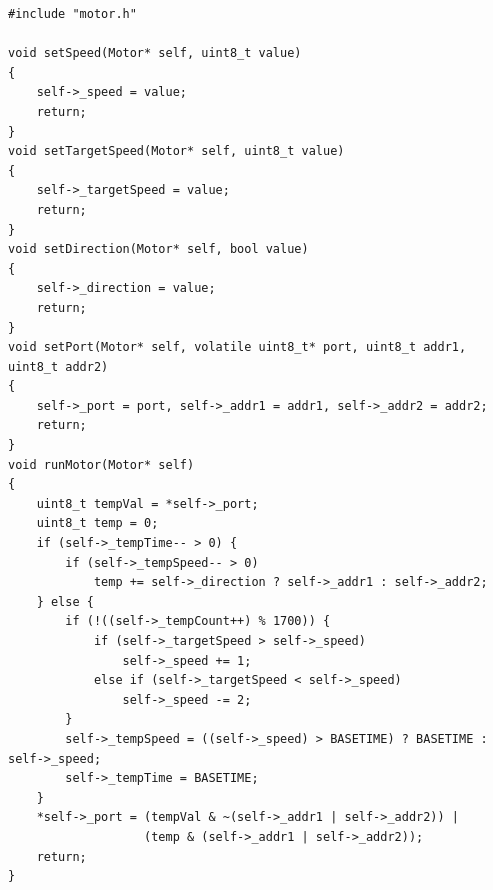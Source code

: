 \documentclass[
]{ltjarticle}
\begin{document}
\begin{verbatim}
#include "motor.h"

void setSpeed(Motor* self, uint8_t value)
{
    self->_speed = value;
    return;
}
void setTargetSpeed(Motor* self, uint8_t value)
{
    self->_targetSpeed = value;
    return;
}
void setDirection(Motor* self, bool value)
{
    self->_direction = value;
    return;
}
void setPort(Motor* self, volatile uint8_t* port, uint8_t addr1, uint8_t addr2)
{
    self->_port = port, self->_addr1 = addr1, self->_addr2 = addr2;
    return;
}
void runMotor(Motor* self)
{
    uint8_t tempVal = *self->_port;
    uint8_t temp = 0;
    if (self->_tempTime-- > 0) {
        if (self->_tempSpeed-- > 0)
            temp += self->_direction ? self->_addr1 : self->_addr2;
    } else {
        if (!((self->_tempCount++) % 1700)) {
            if (self->_targetSpeed > self->_speed)
                self->_speed += 1;
            else if (self->_targetSpeed < self->_speed)
                self->_speed -= 2;
        }
        self->_tempSpeed = ((self->_speed) > BASETIME) ? BASETIME : self->_speed;
        self->_tempTime = BASETIME;
    }
    *self->_port = (tempVal & ~(self->_addr1 | self->_addr2)) | 
                   (temp & (self->_addr1 | self->_addr2));
    return;
}

\end{verbatim}
\end{document}
